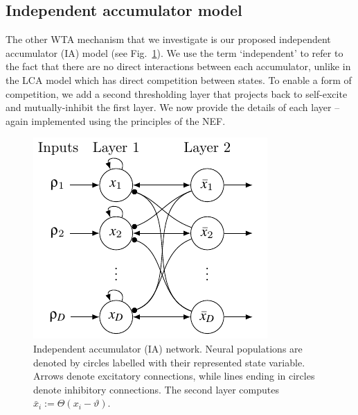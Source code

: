 \documentclass[10pt,letterpaper]{article}
\begin{document}
\subsection{Independent accumulator model}
The other WTA mechanism that we investigate is our proposed independent accumulator (IA) model (see Fig.~\ref{fig:ia-sketch}).
We use the term `independent' to refer to the fact that there are no direct interactions between each accumulator, unlike in the LCA model which has direct competition between states.
To enable a form of competition, we add a second thresholding layer that  projects back to self-excite and mutually-inhibit the first layer.
We now provide the details of each layer -- again implemented using the principles of the NEF\@.
\begin{figure}
    \centering
    \includegraphics{figures/ia-sketch}
    \caption{
        Independent accumulator (IA) network.
        Neural populations are denoted by circles labelled with their represented state variable.
        Arrows denote excitatory connections, while lines ending in circles denote inhibitory connections.
        The second layer computes $\bar{x}_i := \Theta(x_i - \vartheta)$.
    }\label{fig:ia-sketch}
\end{figure}
\end{document}
